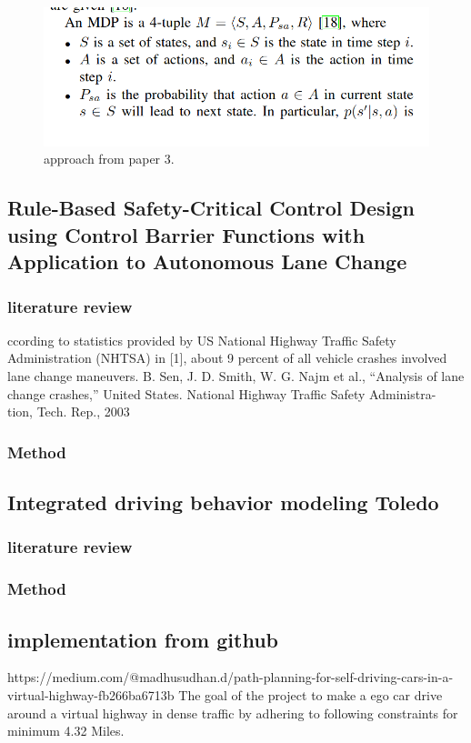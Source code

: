 \documentclass{article}
\begin{document}
\begin{figure}
 \includegraphics[width=\linewidth]{fig3.png}
 \caption{approach from paper 3.}
 \label{fig:Gui}
\end{figure}



  \subsection{Rule-Based Safety-Critical Control Design using Control Barrier
Functions with Application to Autonomous Lane Change}
    \subsubsection{literature review}
    ccording to
statistics provided by US National Highway Traffic Safety
Administration (NHTSA) in [1], about 9 percent of all vehicle
crashes involved lane change maneuvers. B. Sen, J. D. Smith, W. G. Najm et al., “Analysis of lane change
crashes,” United States. National Highway Traffic Safety Administra-
tion, Tech. Rep., 2003
\subsubsection{Method}
  \subsection{Integrated driving behavior modeling Toledo}
    \subsubsection{literature review}
\subsubsection{Method}
  
  \subsection{implementation from github}
  https://medium.com/@madhusudhan.d/path-planning-for-self-driving-cars-in-a-virtual-highway-fb266ba6713b
  The goal of the project to make a ego car drive around a virtual highway in dense traffic by adhering to following constraints for minimum 4.32 Miles.
\end{document}
